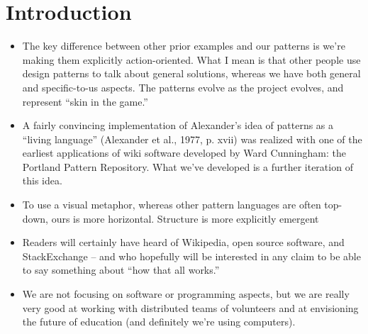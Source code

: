 \section{Introduction}

\begin{itemize}
\item The key difference between other prior examples and our
patterns is we're making them explicitly action-oriented.  What I mean
is that other people use design patterns to talk about general
solutions, whereas we have both general and specific-to-us aspects.
The patterns evolve as the project evolves, and represent ``skin in the game.''
\item A fairly convincing
implementation of Alexander’s idea of patterns as a “living language” (Alexander et
al., 1977, p. xvii) was realized with one of the earliest applications of wiki
software developed by Ward Cunningham: the Portland Pattern Repository.
What we've developed is a further iteration of this idea.
\item To use a visual metaphor, whereas other pattern languages are often top-down,
ours is more horizontal.  Structure is more explicitly emergent
\item Readers will certainly have heard of Wikipedia, open source
software, and StackExchange -- and who hopefully will be interested in
any claim to be able to say something about ``how that all works.''
\item We are not focusing on software or programming aspects, but we
are really very good at working with distributed teams of volunteers and
at envisioning the future of education (and definitely we're using
computers).
\end{itemize}